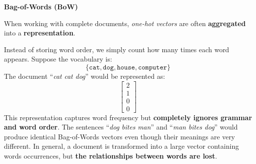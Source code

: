 \highspace
\begin{flushleft}
    \textcolor{Red2}{ \textbf{Bag-of-Words (BoW)}}\label{def:bag-of-words-bow}
\end{flushleft}
When working with complete documents, \emph{one-hot vectors} are often \textbf{aggregated} into a  \textbf{representation}.

\highspace
Instead of storing word order, we simply count how many times each word appears. Suppose the vocabulary is:
\begin{equation*}
    \{\texttt{cat}, \texttt{dog}, \texttt{house}, \texttt{computer}\}
\end{equation*}
The document ``\emph{cat cat dog}'' would be represented as:
\begin{equation*}
    \begin{bmatrix}
        2 \\
        1 \\
        0 \\
        0
    \end{bmatrix}
\end{equation*}
This representation captures word frequency but \textbf{completely ignores grammar and word order}. The sentences ``\emph{dog bites man}'' and ``\emph{man bites dog}'' would produce identical Bag-of-Words vectors even though their meanings are very different. In general, a document is transformed into a large vector containing words occurrences, but \textbf{the relationships between words are lost}.

